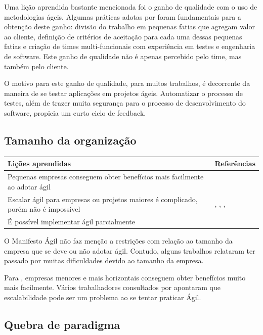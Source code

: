 Uma lição aprendida bastante mencionada foi o ganho de qualidade com o uso de metodologias ágeis. Algumas práticas adotas por \cite{Adobe2012} foram fundamentais para a obtenção deste ganho: divisão do trabalho em pequenas fatias que agregam valor ao cliente, definição de critérios de aceitação para cada uma dessas pequenas fatias e criação de times multi-funcionais com experiência em testes e engenharia de software. Este ganho de qualidade não é apenas percebido pelo time, mas também pelo cliente.

O motivo para este ganho de qualidade, para muitos trabalhos, é decorrente da maneira de se testar aplicações em projetos ágeis. Automatizar o processo de testes, além de trazer muita segurança para o processo de desenvolvimento do software, propicia um curto ciclo de feedback.

\subsection{Tamanho da organização}

\begin{table}[H]
	\centering
	\begin{tabularx}{\linewidth}{ | X | p{5cm} | } \hline \textbf{Lições aprendidas} & \textbf{Referências} \\ \hline
		Pequenas empresas conseguem obter benefícios mais facilmente ao adotar ágil & \cite{Bustard2013} \\ \hline
		Escalar ágil para empresas ou projetos maiores é complicado, porém não é impossível & \cite{Microsoft2013}, \cite{Claudia2013}, \cite{Korhonen2010}, \cite{Maciel2013} \\ \hline
		É possível implementar ágil parcialmente & \cite{Ericsson2013} \\ \hline
	\end{tabularx}
\end{table}

O Manifesto Ágil não faz menção a restrições com relação ao tamanho da empresa que se deve ou não adotar ágil. Contudo, alguns trabalhos relataram ter passado por muitas dificuldades devido ao tamanho da empresa.

Para \cite{Bustard2013}, empresas menores e mais horizontais conseguem obter benefícios muito mais facilmente. Vários trabalhadores consultados por \cite{Microsoft2013} apontaram que escalabilidade pode ser um problema ao se tentar praticar Ágil.

\subsection{Quebra de paradigma}


